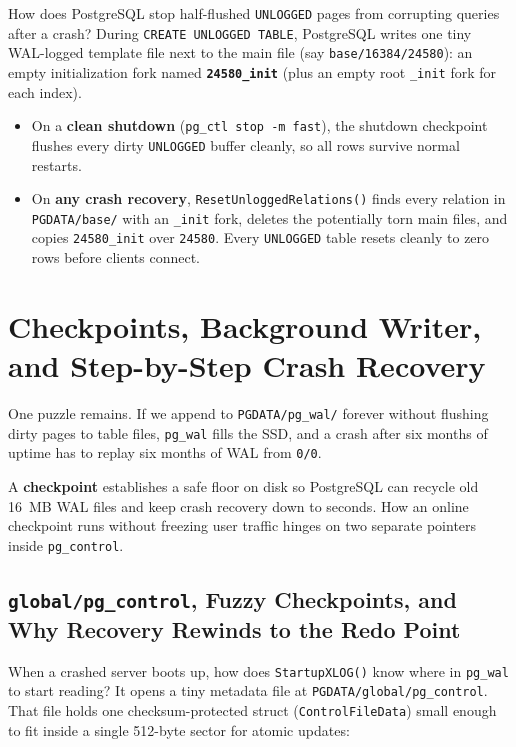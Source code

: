 How does PostgreSQL stop half-flushed \texttt{UNLOGGED} pages from corrupting queries after a crash? During \texttt{CREATE UNLOGGED TABLE}, PostgreSQL writes one tiny WAL-logged template file next to the main file (say \texttt{base/16384/24580}): an empty initialization fork named \textbf{\texttt{24580\_init}} (plus an empty root \texttt{\_init} fork for each index).
\begin{itemize}
  \item On a \textbf{clean shutdown} (\texttt{pg\_ctl stop -m fast}), the shutdown checkpoint flushes every dirty \texttt{UNLOGGED} buffer cleanly, so all rows survive normal restarts.
  \item On \textbf{any crash recovery}, \texttt{ResetUnloggedRelations()} finds every relation in \texttt{PGDATA/base/} with an \texttt{\_init} fork, deletes the potentially torn main files, and copies \texttt{24580\_init} over \texttt{24580}. Every \texttt{UNLOGGED} table resets cleanly to zero rows before clients connect.
\end{itemize}

\section{Checkpoints, Background Writer, and Step-by-Step Crash Recovery}
\label{ch04:recovery}

One puzzle remains. If we append to \texttt{PGDATA/pg\_wal/} forever without flushing dirty pages to table files, \texttt{pg\_wal} fills the SSD, and a crash after six months of uptime has to replay six months of WAL from \texttt{0/0}.

A \textbf{checkpoint} establishes a safe floor on disk so PostgreSQL can recycle old 16~MB WAL files and keep crash recovery down to seconds. How an online checkpoint runs without freezing user traffic hinges on two separate pointers inside \texttt{pg\_control}.

\subsection{\texttt{global/pg\_control}, Fuzzy Checkpoints, and Why Recovery Rewinds to the Redo Point}

When a crashed server boots up, how does \texttt{StartupXLOG()} know where in \texttt{pg\_wal} to start reading? It opens a tiny metadata file at \texttt{PGDATA/global/pg\_control}. That file holds one checksum-protected struct (\texttt{ControlFileData}) small enough to fit inside a single 512-byte sector for atomic updates:

